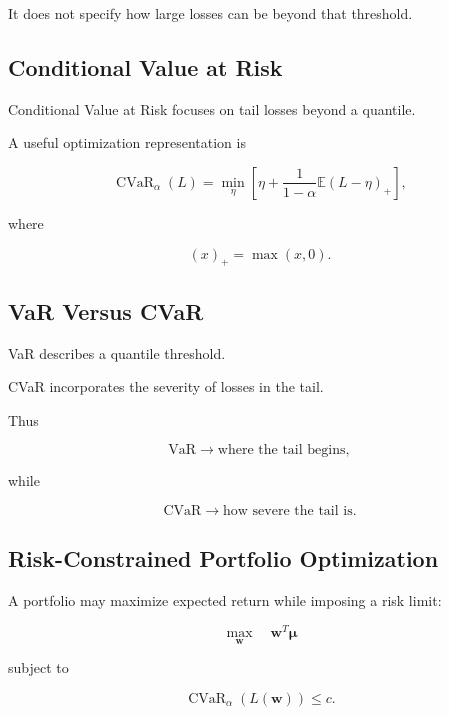 It does not specify how large losses can be beyond that threshold.

\subsection{Conditional Value at Risk}
\label{subsec:cvar-finance}

Conditional Value at Risk focuses on tail losses beyond a quantile.

A useful optimization representation is

\[
\boxed{
\operatorname{CVaR}_{\alpha}(L)
=
\min_{\eta}
\left[
\eta
+
\frac{1}{1-\alpha}
\mathbb{E}(L-\eta)_+
\right],
}
\]

where

\[
(x)_+
=
\max(x,0).
\]

\subsection{VaR Versus CVaR}
\label{subsec:var-versus-cvar}

VaR describes a quantile threshold.

CVaR incorporates the severity of losses in the tail.

Thus

\[
\boxed{
\text{VaR}
\rightarrow
\text{where the tail begins},
}
\]

while

\[
\boxed{
\text{CVaR}
\rightarrow
\text{how severe the tail is}.
}
\]

\subsection{Risk-Constrained Portfolio Optimization}
\label{subsec:risk-constrained-portfolio}

A portfolio may maximize expected return while imposing a risk limit:

\[
\boxed{
\max_{\mathbf{w}}
\quad
\mathbf{w}^T\boldsymbol{\mu}
}
\]

subject to

\[
\boxed{
\operatorname{CVaR}_{\alpha}
(L(\mathbf{w}))
\leq
c.
}
\]

